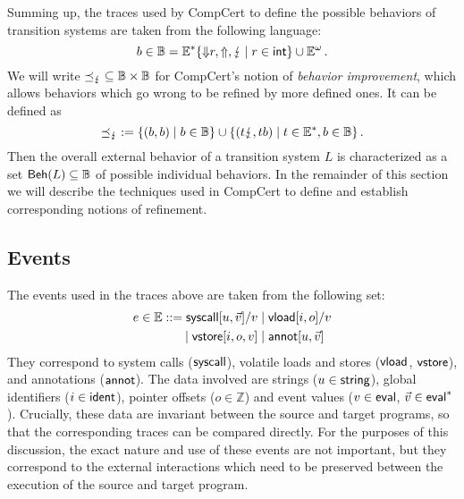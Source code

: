 \documentclass[sigplan,10pt,authordraft]{acmart}
\begin{document}
Summing up,
the traces used by CompCert to define
the possible behaviors of transition systems
are taken from the following language:
\[
  b \in \mathbb{B} =
    \mathbb{E}^*
      \{ {\Downarrow} r, {\Uparrow}, {\lightning} \mid r \in  \mathsf{int}  \}
      \cup
    \mathbb{E}^\omega
  \,.
\]
We will write
${\preceq_\lightning} \subseteq \mathbb{B} \times \mathbb{B}$
for CompCert's notion of \emph{behavior improvement},
which allows behaviors which go wrong to
be refined by more defined ones.
It can be defined as
\[
  {\preceq_\lightning} := \{ (b, b) \mid b \in \mathbb{B} \}
    \cup \{ (t \lightning, t b) \mid
            t \in \mathbb{E}^*, b \in \mathbb{B} \}
  \,.
\]
Then the overall external behavior
of a transition system $L$
is characterized
as a set $ \mathsf{Beh} (L) \subseteq \mathbb{B}$
of possible individual behaviors.
In the remainder of this section we will describe
the techniques used in CompCert to define and establish
corresponding notions of refinement.



\subsection{Events} %

The events used in the traces above are taken from the following set:
\begin{align*}
  e \in \mathbb{E} ::=
     \mathsf{syscall} [u, \vec{v}]/v & \mid
     \mathsf{vload} [i, o]/v \\ \mid
     \mathsf{vstore} [i, o, v] & \mid
     \mathsf{annot} [u, \vec{v}]
\end{align*}
They correspond to system calls ($ \mathsf{syscall} $),
volatile loads and stores ($ \mathsf{vload} $, $ \mathsf{vstore} $),
and annotations ($ \mathsf{annot} $).
The data involved
are strings ($u \in  \mathsf{string} $),
global identifiers ($i \in  \mathsf{ident} $),
pointer offsets ($o \in \mathbb{Z}$) and
event values ($v \in  \mathsf{eval} $, $\vec{v} \in  \mathsf{eval} ^*$).
Crucially,
these data are invariant between the source and target programs,
so that the corresponding traces can be compared directly.
For the purposes of this discussion,
the exact nature and use of these events
are not important,
but they correspond to the external interactions
which need to be preserved between the execution
of the source and target program.
\end{document}
